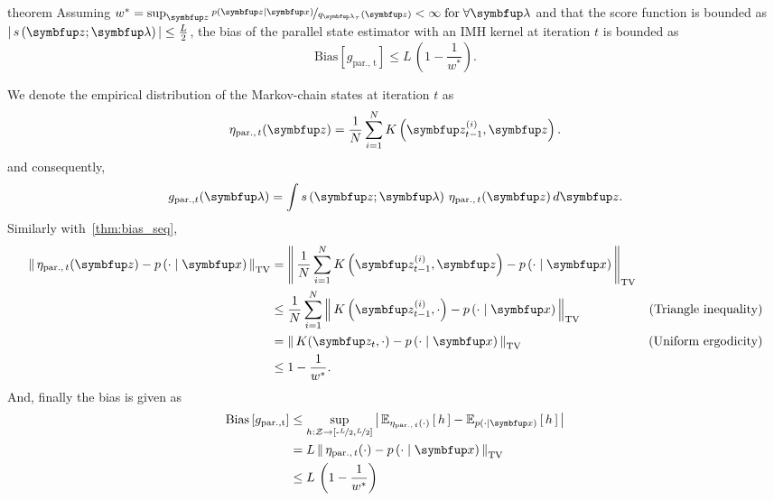 
\begin{theoremEnd}{theorem}
  Assuming \(w^* = \sup_{\vz} \nicefrac{p\left(\vz\mid\vx\right)}{q_{\vlambda_{\tau}}\left(\vz\right)} < \infty \; \text{for}\;\forall \vlambda \) and that the score function is bounded as \(\left|\, s\left(\vz; \vlambda\right) \,\right| \leq \frac{L}{2}\), the bias of the parallel state estimator with an IMH kernel at iteration \(t\) is bounded as
  {\small
\[
    \mathrm{Bias}\left[ g_{\mathrm{par.,\, t}} \right] \leq L\, \left(1 - \frac{1}{w^*}\right).
\]
  }
\end{theoremEnd}
\begin{proofEnd}
  We denote the empirical distribution of the Markov-chain states at iteration \(t\) as
  \begin{align}
    \eta_{\mathrm{par.},\, t}(\vz) = \frac{1}{N} \sum_{i=1}^N K\left(\vz_{t-1}^{(i)}, \vz\right).
  \end{align}
  and consequently,
  \begin{align}
      g_{\mathrm{par.}, t}(\vlambda) = \int s\left(\vz; \vlambda\right) \, \eta_{\mathrm{par.},\, t}(\vz) \, d\vz.
  \end{align}
  Similarly with~\cref{thm:bias_seq}, 
  \begin{align}
    \DTV{ \eta_{\mathrm{par.},\, t}(\vz) }{p\left(\cdot\mid\vx\right)}
    &= \DTV{\frac{1}{N} \sum_{i=1}^N K\left(\vz_{t-1}^{(i)}, \vz\right)}{p\left(\cdot\mid\vx\right)} \\
    &\leq \frac{1}{N} \sum_{i=1}^N  \DTV{K\left(\vz_{t-1}^{(i)}, \cdot\right)}{p\left(\cdot\mid\vx\right)} &\text{(Triangle inequality)} \\
    &=    \DTV{K(\vz_t, \cdot)}{p\left(\cdot\mid\vx\right)} &\text{(Uniform ergodicity)} \\
    &\leq 1 - \frac{1}{w^*}.
  \end{align}
  And, finally the bias is given as
 \begin{align}
   \mathrm{Bias}\left[ g_{\mathrm{par., t}} \right]
   &\leq \sup_{h : \mathcal{Z} \rightarrow \left[ \text{-}\nicefrac{L}{2}, \nicefrac{L}{2} \right]} \left|\, \Esub{\eta_{\mathrm{par.},\, t}(\cdot)}{h} - \Esub{p(\cdot\mid\vx)}{h} \,\right| \\
   &= L\, \DTV{ \eta_{\mathrm{par.},\, t}(\cdot) }{p\left(\cdot\mid\vx\right)}  \\
   &\leq L \, \left(1 - \frac{1}{w^*}\right)
 \end{align}
\end{proofEnd}

